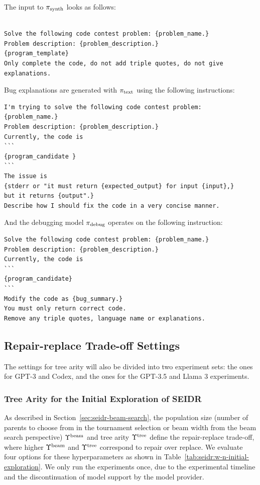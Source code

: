 The input to $ \pi_\text{synth} $ looks as follows: 
\begin{lstlisting}

Solve the following code contest problem: {problem_name.}
Problem description: {problem_description.}
{program_template}
Only complete the code, do not add triple quotes, do not give explanations.
\end{lstlisting}

Bug explanations are generated with $ \pi_\text{text} $ using the following instructions:
\begin{lstlisting}
I'm trying to solve the following code contest problem: {problem_name.}
Problem description: {problem_description.}
Currently, the code is
```
{program_candidate }
```
The issue is 
{stderr or "it must return {expected_output} for input {input},} 
but it returns {output".}
Describe how I should fix the code in a very concise manner. 
\end{lstlisting}

And the debugging model $ \pi_\text{debug} $ operates on the following instruction:
\begin{lstlisting}
Solve the following code contest problem: {problem_name.} 
Problem description: {problem_description.} 
Currently, the code is  
```
{program_candidate} 
```
Modify the code as {bug_summary.} 
You must only return correct code.  
Remove any triple quotes, language name or explanations.
\end{lstlisting}



\subsection{Repair-replace Trade-off Settings}
\label{sec:seidr-trade-off-settings}

The settings for tree arity will also be divided into two experiment sets: the ones for GPT-3 and Codex, and the ones for the GPT-3.5 and Llama 3 experiments.

\subsubsection{Tree Arity for the Initial Exploration of SEIDR}
\label{sec:seidr-tree arity-gpt-3}
As described in Section~\ref{sec:seidr-beam-search}, the population size (number of parents to choose from in the tournament selection or beam width from the beam search perspective) $\Upsilon^\text{beam}{}$ and tree arity $\Upsilon^\text{tree}{}$ define the repair-replace trade-off, where higher $\Upsilon^\text{beam}{}$ and $\Upsilon^\text{tree}{}$ correspond to repair over replace. 
We evaluate four options for these hyperparameters as shown in Table~\ref{tab:seidr:w-n-initial-exploration}. 
We only run the experiments once, due to the experimental timeline and the discontinuation of model support by the model provider. 



